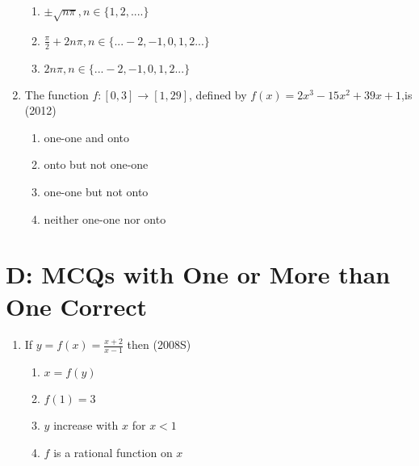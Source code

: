 \documentclass[journal,12pt,twocolumn]{IEEEtran}
\theoremstyle{remark}
\begin{document}
\begin{enumerate}
\begin{enumerate}
    \item $ \pm \sqrt{n\pi},n\in \{1,2,....\}$
    \item $ \frac{\pi}{2}+2n\pi,n \in\{...-2,-1,0,1,2...\} $
    \item $ 2n\pi,n\in \{...-2,-1,0,1,2...\}$
\end{enumerate}
\item The function $ f:[0,3] \rightarrow [1,29] $, defined by $ f(x)=2x^3-15x^2+39x+1 $,is 
\hfill(2012)
\begin{enumerate}
    \item one-one and onto 
    \item onto but not one-one 
    \item one-one but not onto
    \item neither one-one nor onto
\end{enumerate}
\end{enumerate}
\section {D: MCQs with One or More than One Correct}
\begin{enumerate}
\item If $y=f(x)=\frac{x+2}{x-1}$ then
\hfill(2008S)
\begin{enumerate}
    \item $x=f(y)$
    \item $f(1)=3$
    \item $y$ increase with $x$ for $x<1$
    \item $f$ is a rational function on $x$
\end{enumerate}
\end{enumerate}
\end{document}
